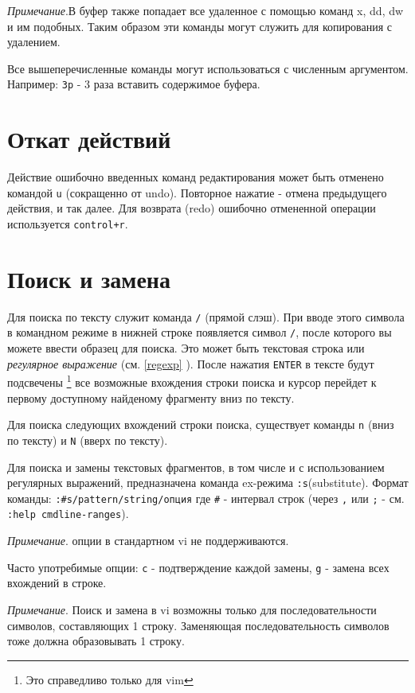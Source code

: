 \emph{Примечание}.В буфер также попадает все удаленное с помощью команд x, dd, dw и им подобных. Таким образом эти команды могут служить для копирования с удалением.

Все вышеперечисленные команды могут использоваться с численным аргументом. Например: \verb+3p+ - 3 раза вставить содержимое буфера.

\section{Откат действий}

Действие ошибочно введенных команд редактирования может быть отменено командой \verb+u+ (сокращенно от undo). Повторное нажатие - отмена предыдущего действия, и так далее. Для возврата (redo) ошибочно отмененной операции используется \verb-control+r-.

\section{Поиск и замена}

Для поиска по тексту служит команда \verb+/+ (прямой слэш). При вводе этого символа в командном режиме в нижней строке появляется символ \verb+/+, после которого вы можете ввести образец для поиска. Это может быть текстовая строка или \emph{регулярное выражение} (см. \ref{regexp} ). После нажатия \verb+ENTER+ в тексте будут подсвечены \footnote{Это справедливо только для vim} все возможные вхождения строки поиска и курсор перейдет к первому доступному найденому фрагменту вниз по тексту.

Для поиска следующих вхождений строки поиска, существует команды \verb+n+ (вниз по тексту) и \verb+N+ (вверх по тексту).

Для поиска и замены текстовых фрагментов, в том числе и с использованием регулярных выражений, предназначена команда ex-режима \verb+:s+(substitute). Формат команды: \newline
\verb+:#s/pattern/string/опция+\newline
где \verb+#+ - интервал строк (через \verb+,+ или \verb+;+ - см. \verb+:help cmdline-ranges+).

\emph{Примечание}. опции в стандартном vi не поддерживаются.

Часто употребимые опции: \verb+c+ - подтверждение каждой замены, \verb+g+ - замена всех вхождений в строке.

\emph{Примечание}. Поиск и замена в vi возможны только для последовательности символов, составляющих 1 строку. Заменяющая последовательность символов тоже должна образовывать 1 строку.
 

